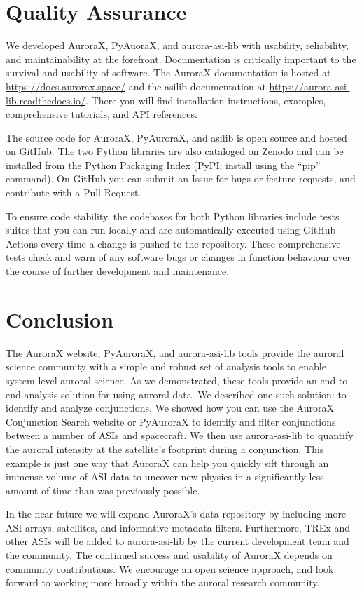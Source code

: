 \documentclass[utf8]{FrontiersinHarvard} %
\begin{document}
\section{Quality Assurance}
We developed AuroraX, PyAuoraX, and aurora-asi-lib with usability, reliability, and maintainability at the forefront. Documentation is critically important to the survival and usability of software. The AuroraX documentation is hosted at \url{https://docs.aurorax.space/} and the asilib documentation at \url{https://aurora-asi-lib.readthedocs.io/}. There you will find installation instructions, examples, comprehensive tutorials, and API references.

The source code for AuroraX, PyAuroraX, and asilib  is open source and hosted on GitHub. The two Python libraries are also cataloged on Zenodo and can be installed from the Python Packaging Index (PyPI; install using the “pip” command). On GitHub you can submit an Issue for bugs or feature requests, and contribute with a Pull Request.  

To ensure code stability, the codebases for both Python libraries include tests suites that you can run locally and are automatically executed using GitHub Actions every time a change is pushed to the repository. These comprehensive tests check and warn of any software bugs or changes in function behaviour over the course of further development and maintenance.


\section{Conclusion}
The AuroraX website, PyAuroraX, and aurora-asi-lib tools provide the auroral science community with a simple and robust set of analysis tools to enable system-level auroral science. As we demonstrated, these tools provide an end-to-end analysis solution for using auroral data. We described one such solution: to identify and analyze conjunctions. We showed how you can use the AuroraX Conjunction Search website or PyAuroraX to identify and filter conjunctions between a number of ASIs and spacecraft. We then use aurora-asi-lib to quantify the auroral intensity at the satellite's footprint during a conjunction. This example is just one way that AuroraX can help you quickly sift through an immense volume of ASI data to uncover new physics in a significantly less amount of time than was previously possible.

In the near future we will expand AuroraX’s data repository by including more ASI arrays, satellites, and informative metadata filters. Furthermore, TREx and other ASIs will be added to aurora-asi-lib by the current development team and the community. The continued success and usability of AuroraX depends on community contributions. We encourage an open science approach, and look forward to working more broadly within the auroral research community.
\end{document}
